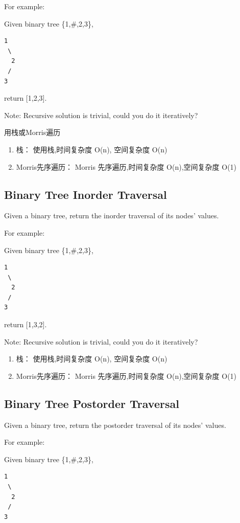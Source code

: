 \documentclass[12pt]{book}
\begin{document}
For example:

Given binary tree \{1,\#,2,3\},
\lstset{language=java,label= ,caption= ,numbers=none}
\begin{lstlisting}
1
 \
  2
 /
3
\end{lstlisting}

return [1,2,3].

Note: Recursive solution is trivial, could you do it iteratively?

用栈或Morris遍历
\begin{enumerate}
\item 栈： 使用栈,时间复杂度 O(n), 空间复杂度 O(n)
\label{sec-4-1-1-1}
\item Morris先序遍历： Morris 先序遍历,时间复杂度 O(n),空间复杂度 O(1)
\label{sec-4-1-1-2}
\end{enumerate}

\subsection{Binary Tree Inorder Traversal}
\label{sec-4-1-2}
Given a binary tree, return the inorder traversal of its nodes' values.

For example:

Given binary tree \{1,\#,2,3\},
\lstset{language=java,label= ,caption= ,numbers=none}
\begin{lstlisting}
1
 \
  2
 /
3
\end{lstlisting}

return [1,3,2].

Note: Recursive solution is trivial, could you do it iteratively?
\begin{enumerate}
\item 栈： 使用栈,时间复杂度 O(n), 空间复杂度 O(n)
\label{sec-4-1-2-1}
\item Morris先序遍历： Morris 先序遍历,时间复杂度 O(n),空间复杂度 O(1)
\label{sec-4-1-2-2}
\end{enumerate}


\subsection{Binary Tree Postorder Traversal}
\label{sec-4-1-3}
Given a binary tree, return the postorder traversal of its nodes' values.

For example:

Given binary tree \{1,\#,2,3\},
\lstset{language=java,label= ,caption= ,numbers=none}
\begin{lstlisting}
1
 \
  2
 /
3
\end{lstlisting}
\end{document}
